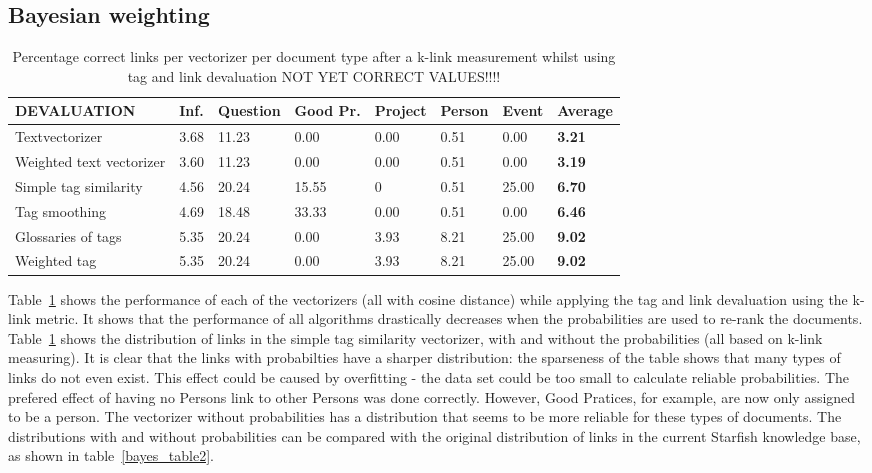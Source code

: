 \subsection{Bayesian weighting}
\begin{table}
\begin{tabular}{| l | l | l | l | l | l | l | l |}
\hline
DEVALUATION & Inf. &  Question &  Good Pr.& Project & Person &  Event & {\bf Average} \\
\hline
Textvectorizer & 3.68 & 11.23 & 0.00 & 0.00 & 0.51 & 0.00 & {\bf 3.21}\\
Weighted text vectorizer & 3.60 & 11.23 & 0.00 & 0.00 & 0.51 & 0.00 & {\bf 3.19} \\ 
Simple tag similarity & 4.56 & 20.24 & 15.55 & 0 & 0.51 & 25.00 & {\bf 6.70}\\
Tag smoothing & 4.69 & 18.48 & 33.33 & 0.00 & 0.51 & 0.00 & {\bf 6.46}\\
Glossaries of tags & 5.35 & 20.24 & 0.00 & 3.93 & 8.21 & 25.00 & {\bf 9.02}\\
Weighted tag & 5.35 & 20.24 & 0.00 & 3.93 & 8.21 & 25.00 & {\bf 9.02}\\
\hline
\end{tabular}
\caption{Percentage correct links per vectorizer per document type after a k-link measurement whilst using tag and link devaluation NOT YET CORRECT VALUES!!!!}
\label{bayes_table1}
\end{table}

Table~\ref{bayes_table1} shows the performance of each of the vectorizers (all
with cosine distance) while applying the tag and link devaluation using the
k-link metric. It shows that the performance of all algorithms drastically
decreases when the probabilities are used to re-rank the documents. 
Table~\ref{bayes_table1}  shows the distribution of links in the simple tag
similarity vectorizer, with and without the probabilities (all based on k-link
measuring). It is clear that the links with probabilties have a sharper
distribution: the sparseness of the table shows that many types of links do not
even exist. This effect could be caused by overfitting - the data set could be
too small to calculate reliable probabilities. The prefered effect of having no
Persons link to other Persons was done correctly. However, Good Pratices, for
example, are now only assigned to be a person. The vectorizer without
probabilities has a distribution that seems to be more reliable for these types
of documents. The distributions with and without probabilities can be compared
with the original distribution of links in the current Starfish knowledge base,
as shown in table~\ref{bayes_table2}.  


